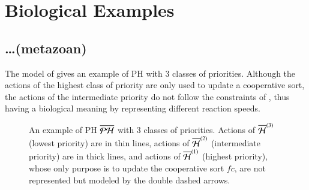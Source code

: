 
\section{Biological Examples}\label{sec:example}

\subsection{\ldots (metazoan)}



\begin{example}
  The model of  gives an example of PH with $3$ classes of priorities.
  Although the actions of the highest class of priority are only used to update a cooperative sort,
  the actions of the intermediate priority do not follow the constraints of ,
  thus having a biological meaning by representing different reaction speeds.

  \begin{figure}[htp]
    \centering
    \caption{
    \label{fig:metazoan-php}
      An example of PH $\overline{\mathcal{PH}}$ with $3$ classes of priorities.
      Actions of $\overline{\mathcal{H}}^{(3)}$ (lowest priority) are in thin lines,
      actions of $\overline{\mathcal{H}}^{(2)}$ (intermediate priority) are in thick lines,
      and actions of $\overline{\mathcal{H}}^{(1)}$ (highest priority), whose only purpose is to update the cooperative sort $fc$,
      are not represented but modeled by the double dashed arrows.
    }
  \end{figure}
\end{example}

